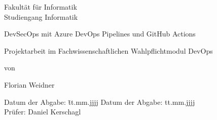 \begin{titlepage}

\sffamily

\raggedleft

\vspace*{-2cm}


\vfill

\centering
\LARGE
Fakultät für Informatik  \vspace{0.5cm}\\
\Large
Studiengang Informatik

\vspace{2cm}

\LARGE

DevSecOps mit Azure DevOps Pipelines und GitHub Actions

\vspace{2cm}

\Large
Projektarbeit im Fachwissenschaftlichen Wahlpflichtmodul DevOps

\vspace{1.5cm}


\Large
von

\vspace{0.5cm}


\LARGE
Florian Weidner \vspace{1cm}

\vspace{1cm}

\flushleft
 \Large
\vspace*{\fill}

\begin{tabbing}
Datum der Abgabe: \= tt.mm.jjjj \kill
Datum der Abgabe: \> tt.mm.jjjj \\
Prüfer: \> Daniel Kerschagl \\

\end{tabbing}

\end{titlepage}